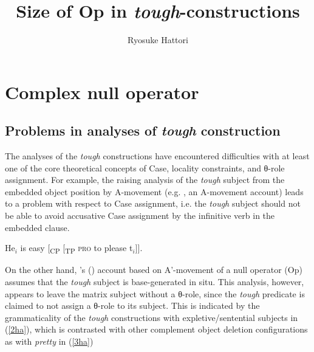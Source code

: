 \documentclass[output=paper]{langscibook}
\author{Ryosuke Hattori \affiliation{Kobe Gakuin University}}
\title{Size of Op in \textit{tough}-constructions}
\begin{document}
\maketitle

\section{Complex null operator}
\subsection{Problems in analyses of \textit{tough} construction}
The analyses of the \textit{tough} constructions have encountered difficulties with at least one of the core theoretical concepts of Case, locality constraints, and θ-role assignment. For example, the raising analysis of the \textit{tough} subject from the embedded object position by A-movement (e.g. \citeauthor{Rosenbaum1967} \citeyear{Rosenbaum1967}, an A-movement account) leads to a problem with respect to Case assignment, i.e. the \textit{tough} subject should not be able to avoid accusative Case assignment by the infinitive verb in the embedded clause.

\begin{exe}
\ex \label{1ha}
He$_{i}$ is easy [\textsubscript{CP} [\textsubscript{TP} \textsc{pro} to please t$_{i}$]].
\end{exe}

On the other hand, \citeauthor{Chomsky1977}'s (\citeyear{Chomsky1977}) account based on A'-movement of a null operator (Op) assumes that the \textit{tough} subject is base-generated in situ. This analysis, however, appears to leave the matrix subject without a θ-role, since the \textit{tough} predicate is claimed to not assign a θ-role to its subject. This is indicated by the grammaticality of the \textit{tough} constructions with expletive/sentential subjects in (\ref{2ha}), which is contrasted with other complement object deletion configurations as with \textit{pretty} in (\ref{3ha}) 

\begin{exe}
\ex \label{2ha}
\begin{xlist}
\end{xlist}
\ex \label{3ha}
\begin{xlist}
\end{xlist}
\end{exe}
\end{document}
